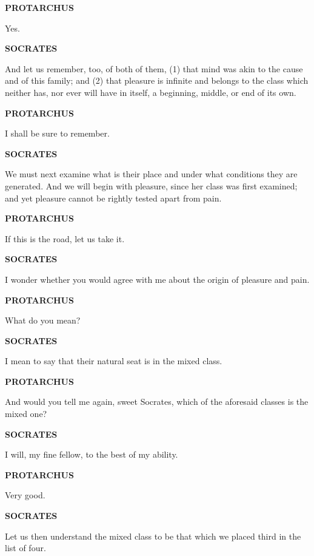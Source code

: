 \documentclass[11pt,letter]{article}
\begin{document}
\par \textbf{PROTARCHUS}
\par   Yes.

\par \textbf{SOCRATES}
\par   And let us remember, too, of both of them, (1) that mind was akin to the cause and of this family; and (2) that pleasure is infinite and belongs to the class which neither has, nor ever will have in itself, a beginning, middle, or end of its own.

\par \textbf{PROTARCHUS}
\par   I shall be sure to remember.

\par \textbf{SOCRATES}
\par   We must next examine what is their place and under what conditions they are generated. And we will begin with pleasure, since her class was first examined; and yet pleasure cannot be rightly tested apart from pain.

\par \textbf{PROTARCHUS}
\par   If this is the road, let us take it.

\par \textbf{SOCRATES}
\par   I wonder whether you would agree with me about the origin of pleasure and pain.

\par \textbf{PROTARCHUS}
\par   What do you mean?

\par \textbf{SOCRATES}
\par   I mean to say that their natural seat is in the mixed class.

\par \textbf{PROTARCHUS}
\par   And would you tell me again, sweet Socrates, which of the aforesaid classes is the mixed one?

\par \textbf{SOCRATES}
\par   I will, my fine fellow, to the best of my ability.

\par \textbf{PROTARCHUS}
\par   Very good.

\par \textbf{SOCRATES}
\par   Let us then understand the mixed class to be that which we placed third in the list of four.
\end{document}
